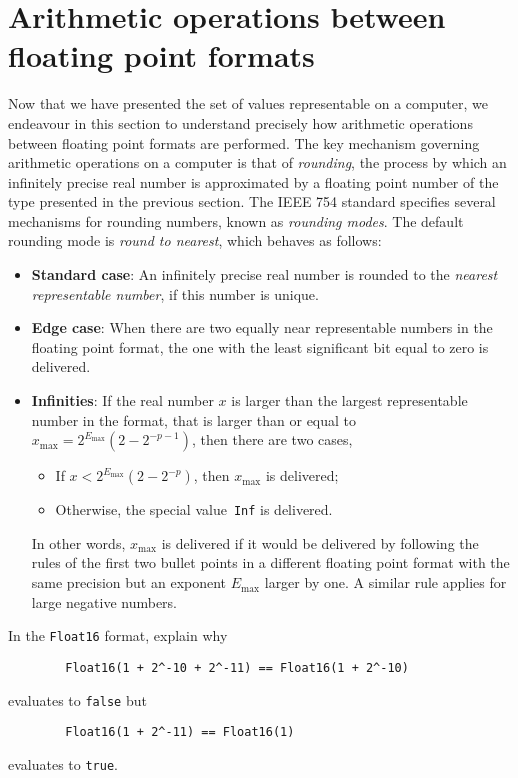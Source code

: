 \section{Arithmetic operations between floating point formats}%
\label{sec:arithmetic_operations_between_floating_point_formats}

Now that we have presented the set of values representable on a computer,
we endeavour in this section to understand precisely how arithmetic operations between floating point formats are performed.
The key mechanism governing arithmetic operations on a computer is that of \emph{rounding},
the process by which an infinitely precise real number is approximated by a floating point number of the type presented in the previous section.
The IEEE 754 standard specifies several mechanisms for rounding numbers,
known as \emph{rounding modes}.
The default rounding mode is \emph{round to nearest},
which behaves as follows:
\begin{itemize}
    \item
        \textbf{Standard case}:
        An infinitely precise real number is rounded to the \emph{nearest representable number},
        if this number is unique.
    \item
        \textbf{Edge case}:
        When there are two equally near representable numbers in the floating point format,
        the one with the least significant bit equal to zero is delivered.
    \item
        \textbf{Infinities}:
        If the real number $x$ is larger than the largest representable number in the format,
        that is larger than or equal to $x_{\max} = 2^{E_{\max}} (2 - 2^{-p-1})$,
        then there are two cases,
        \begin{itemize}
            \item If $x < 2^{E_{\max}} (2 - 2^{-p})$, then $x_{\max}$ is delivered;
            \item Otherwise, the special value~\texttt{Inf} is delivered.
        \end{itemize}
        In other words, $x_{\max}$ is delivered if it would be delivered by following the rules of the first two bullet points
        in a different floating point format with the same precision but an exponent $E_{\max}$ larger by one.
        A similar rule applies for large negative numbers.
\end{itemize}

\begin{exercise}
    In the \texttt{Float16} format, explain why
    \begin{verbatim}
        Float16(1 + 2^-10 + 2^-11) == Float16(1 + 2^-10)
    \end{verbatim}
    evaluates to \texttt{false}
    but
    \begin{verbatim}
        Float16(1 + 2^-11) == Float16(1)
    \end{verbatim}
    evaluates to \texttt{true}.
\end{exercise}

